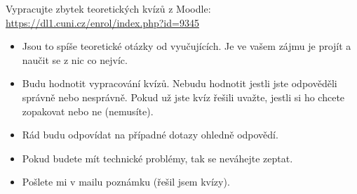 Vypracujte zbytek teoretických kvízů z Moodle: \\
\url{https://dl1.cuni.cz/enrol/index.php?id=9345}

\begin{itemize}

	\item  Jsou to spíše teoretické otázky od vyučujících.
		Je ve vašem zájmu je projít a naučit se z nic co nejvíc.

	\item  Budu hodnotit vypracování kvízů.
		Nebudu hodnotit jestli jste odpověděli správně nebo nesprávně.
		Pokud už jste kvíz řešili uvažte, jestli si ho chcete zopakovat nebo ne (nemusíte).

	\item  Rád budu odpovídat na případné dotazy ohledně odpovědí.

	\item  Pokud budete mít technické problémy, tak se neváhejte zeptat.

	\item  Pošlete mi v mailu poznámku (řešil jsem kvízy).

\end{itemize}

